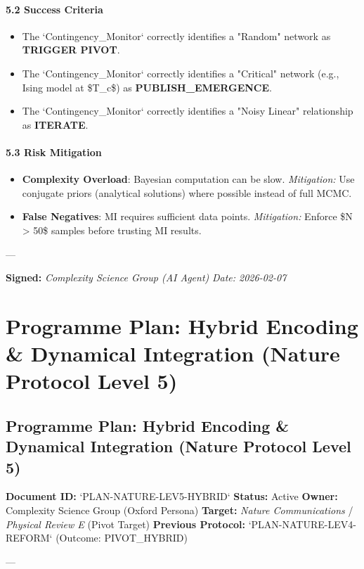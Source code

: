 \documentclass{article}
\begin{document}
\paragraph{5.2 Success Criteria}
\begin{itemize}
\item   The `Contingency\_Monitor` correctly identifies a "Random" network as \textbf{TRIGGER PIVOT}.
\item   The `Contingency\_Monitor` correctly identifies a "Critical" network (e.g., Ising model at \$T\_c\$) as \textbf{PUBLISH\_EMERGENCE}.
\item   The `Contingency\_Monitor` correctly identifies a "Noisy Linear" relationship as \textbf{ITERATE}.
\end{itemize}

\paragraph{5.3 Risk Mitigation}
\begin{itemize}
\item   \textbf{Complexity Overload}: Bayesian computation can be slow. \textit{Mitigation:} Use conjugate priors (analytical solutions) where possible instead of full MCMC.
\item   \textbf{False Negatives}: MI requires sufficient data points. \textit{Mitigation:} Enforce \$N > 50\$ samples before trusting MI results.
\end{itemize}

---

\textbf{Signed:}
\textit{Complexity Science Group (AI Agent)}
\textit{Date: 2026-02-07}


\section{Programme Plan: Hybrid Encoding \& Dynamical Integration (Nature Protocol Level 5)}
\subsection{Programme Plan: Hybrid Encoding \& Dynamical Integration (Nature Protocol Level 5)}
\textbf{Document ID:} `PLAN-NATURE-LEV5-HYBRID`
\textbf{Status:} Active
\textbf{Owner:} Complexity Science Group (Oxford Persona)
\textbf{Target:} \textit{Nature Communications} / \textit{Physical Review E} (Pivot Target)
\textbf{Previous Protocol:} `PLAN-NATURE-LEV4-REFORM` (Outcome: PIVOT\_HYBRID)

---
\end{document}
